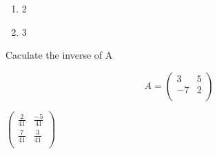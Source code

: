 \documentclass[
]{article}
\begin{document}
\begin{answer}
\begin{enumerate}
\item 2
\item 3
\end{enumerate}
\end{answer}

\begin{exercise}
\protect\hypertarget{exr:calcinverse}{}\label{exr:calcinverse}Caculate the inverse of A

\[A = \begin{pmatrix}
            3 & 5\\
            -7 & 2\\
        \end{pmatrix}\]
\end{exercise}

\begin{answer}
$\begin{pmatrix}
\frac{2}{41} & \frac{-5}{41}\\
\frac{7}{41} & \frac{3}{41}\\
\end{pmatrix}$
\end{answer}
\end{document}

